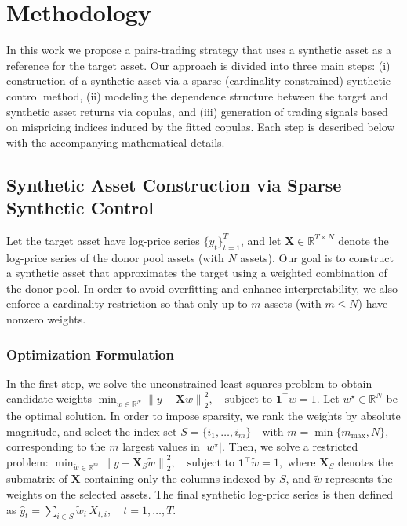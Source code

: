 \section{Methodology}

In this work we propose a pairs-trading strategy that uses a synthetic asset as a reference for the target asset. Our approach is divided into three main steps: (i) construction of a synthetic asset via a sparse (cardinality-constrained) synthetic control method, (ii) modeling the dependence structure between the target and synthetic asset returns via copulas, and (iii) generation of trading signals based on mispricing indices induced by the fitted copulas. Each step is described below with the accompanying mathematical details.

\subsection{Synthetic Asset Construction via Sparse Synthetic Control}

Let the target asset have log-price series $\{y_t\}_{t=1}^T$, and let $\mathbf{X} \in \mathbb{R}^{T \times N}$ denote the log-price series of the donor pool assets (with $N$ assets). Our goal is to construct a synthetic asset that approximates the target using a weighted combination of the donor pool. In order to avoid overfitting and enhance interpretability, we also enforce a cardinality restriction so that only up to $m$ assets (with $m \leq N$) have nonzero weights.

\subsubsection*{Optimization Formulation}

In the first step, we solve the unconstrained least squares problem to obtain candidate weights
$
\min_{w \in \mathbb{R}^{N}} \left\| y - \mathbf{X}w \right\|_2^2, \quad \text{subject to } \mathbf{1}^\top w = 1.
$
Let $w^\star \in \mathbb{R}^{N}$ be the optimal solution. In order to impose sparsity, we rank the weights by absolute magnitude, and select the index set
$
S = \{ i_1, \ldots, i_m \} \quad \text{with } m = \min\{m_{\max}, N\},
$
corresponding to the $m$ largest values in $|w^\star|$. Then, we solve a restricted problem:
$
\min_{\tilde{w} \in \mathbb{R}^{m}} \left\| y - \mathbf{X}_S \tilde{w} \right\|_2^2, \quad \text{subject to } \mathbf{1}^\top \tilde{w} = 1,
$
where $\mathbf{X}_S$ denotes the submatrix of $\mathbf{X}$ containing only the columns indexed by $S$, and $\tilde{w}$ represents the weights on the selected assets. The final synthetic log-price series is then defined as
$
\hat{y}_t = \sum_{i \in S} \tilde{w}_i \, X_{t,i}, \quad t=1,\ldots,T.
$

